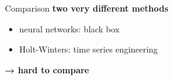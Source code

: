 \documentclass{beamer}
\begin{document}
  \begin{frame}{Comparison}
   \textbf{two very different methods}
   \begin{itemize}
    \item neural networks: black box
    \item Holt-Winters: time series engineering 
   \end{itemize}
   
   \hspace{10pt}
   
   \textbf{→ hard to compare}
  \end{frame}

  
\end{document}
